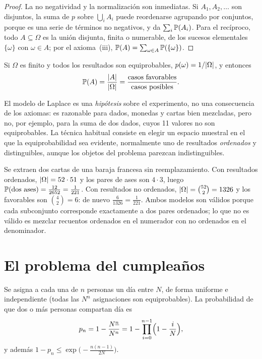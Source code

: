 \begin{proof}
La no negatividad y la normalización son inmediatas. Si $A_1,A_2,\dots$ son disjuntos, la suma de $p$ sobre $\bigcup_iA_i$ puede reordenarse agrupando por conjuntos, porque es una serie de términos no negativos, y da $\sum_i\mathbb{P}(A_i)$. Para el recíproco, todo $A\subseteq\Omega$ es la unión disjunta, finita o numerable, de los sucesos elementales $\{\omega\}$ con $\omega\in A$; por el axioma~(iii), $\mathbb{P}(A)=\sum_{\omega\in A}\mathbb{P}(\{\omega\})$.
\end{proof}

\begin{definicion}\label{def:t3-laplace}
Si $\Omega$ es finito y todos los resultados son equiprobables, $p(\omega)=1/\lvert\Omega\rvert$, y entonces
\[
\mathbb{P}(A)=\frac{\lvert A\rvert}{\lvert\Omega\rvert}=\frac{\text{casos favorables}}{\text{casos posibles}}.
\]
\end{definicion}

El modelo de Laplace es una \emph{hipótesis} sobre el experimento, no una consecuencia de los axiomas: es razonable para dados, monedas y cartas bien mezcladas, pero no, por ejemplo, para la suma de dos dados, cuyos 11 valores no son equiprobables. La técnica habitual consiste en elegir un espacio muestral en el que la equiprobabilidad sea evidente, normalmente uno de resultados \emph{ordenados} y distinguibles, aunque los objetos del problema parezcan indistinguibles.

\begin{ejemplo}\label{ej:t3-ases}
Se extraen dos cartas de una baraja francesa sin reemplazamiento. Con resultados ordenados, $\lvert\Omega\rvert=52\cdot51$ y los pares de ases son $4\cdot3$, luego $\mathbb{P}(\text{dos ases})=\frac{12}{2652}=\frac{1}{221}$. Con resultados no ordenados, $\lvert\Omega\rvert=\binom{52}{2}=1326$ y los favorables son $\binom{4}{2}=6$: de nuevo $\frac{6}{1326}=\frac1{221}$. Ambos modelos son válidos porque cada subconjunto corresponde exactamente a dos pares ordenados; lo que no es válido es mezclar recuentos ordenados en el numerador con no ordenados en el denominador.
\end{ejemplo}

\section{El problema del cumpleaños}

\begin{proposicion}\label{prop:t3-cumple}
Se asigna a cada una de $n$ personas un día entre $N$, de forma uniforme e independiente (todas las $N^{n}$ asignaciones son equiprobables). La probabilidad de que dos o más personas compartan día es
\[
p_n=1-\frac{N^{\underline{n}}}{N^{n}}=1-\prod_{i=0}^{n-1}\Bigl(1-\frac{i}{N}\Bigr),
\]
y además $1-p_n\le\exp\!\bigl(-\tfrac{n(n-1)}{2N}\bigr)$.
\end{proposicion}

